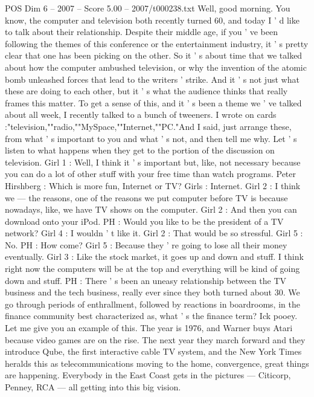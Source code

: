 \begin{textsample}{POS Dim 6 – 2007 – Score 5.00 – 2007/t000238.txt}  \label{ex:f6_pos_018}
Well, good morning.
You know, the computer and television both recently turned 60, and today I ' d like to talk about their relationship.
Despite their middle age, if you ' ve been following the themes of this conference or the entertainment industry, it ' s pretty clear that one has been picking on the other.
So it ' s about time that we talked about how the computer ambushed television, or why the invention of the atomic bomb unleashed forces that lead to the writers ' strike.
And it ' s not just what these are doing to each other, but it ' s what the audience thinks that really frames this matter.
To get a sense of this, and it ' s been a theme we ' ve talked about all week, I recently talked to a bunch of tweeners.
I wrote on cards :"television,""radio,""MySpace,""Internet,""PC."And I said, just arrange these, from what ' s important to you and what ' s not, and then tell me why.
Let ' s listen to what happens when they get to the portion of the discussion on television.
Girl 1 : Well, I think it ' s important but, like, not necessary because you can do a lot of other stuff with your free time than watch programs.
Peter Hirshberg : Which is more fun, Internet or TV?
Girls : Internet.
Girl 2 : I think we — the reasons, one of the reasons we put computer before TV is because nowadays, like, we have TV shows on the computer.
Girl 2 : And then you can download onto your iPod.
PH : Would you like to be the president of a TV network?
Girl 4 : I wouldn ' t like it.
Girl 2 : That would be so stressful.
Girl 5 : No.
PH : How come?
Girl 5 : Because they ' re going to lose all their money eventually.
Girl 3 : Like the stock market, it goes up and down and stuff.
I think right now the computers will be at the top and everything will be kind of going down and stuff.
PH : There ' s been an uneasy relationship between the TV business and the tech business, really ever since they both turned about 30.
We go through periods of enthrallment, followed by reactions in boardrooms, in the finance community best characterized as, what ' s the finance term?
Ick pooey.
Let me give you an example of this.
The year is 1976, and Warner buys Atari because video games are on the rise.
The next year they march forward and they introduce Qube, the first interactive cable TV system, and the New York Times heralds this as telecommunications moving to the home, convergence, great things are happening.
Everybody in the East Coast gets in the pictures — Citicorp, Penney, RCA — all getting into this big vision.

\end{textsample}
